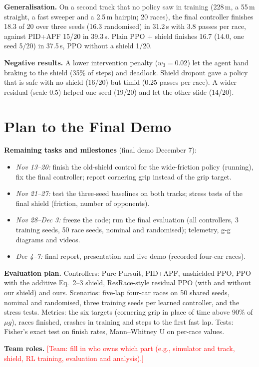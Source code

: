 \documentclass[conference]{IEEEtran}
\newcommand{\todo}[1]{\textcolor{red}{[#1]}}
\begin{document}
\textbf{Generalisation.} On a second track that no policy saw in training (228\,m, a 55\,m straight, a fast
sweeper and a 2.5\,m hairpin; 20 races), the final controller finishes 18.3 of 20 over three seeds (16.3 randomised) in
31.2\,s with 3.8 passes per race, against PID+APF 15/20 in 39.3\,s. Plain PPO + shield finishes 16.7 (14.0, one
seed 5/20) in 37.5\,s, PPO without a shield 1/20.

\textbf{Negative results.} A lower intervention penalty ($w_3 = 0.02$) let the agent hand braking to the
shield (35\% of steps) and deadlock. Shield dropout gave a policy that is safe with no shield (16/20) but timid
(0.25 passes per race). A wider residual (scale 0.5) helped one seed (19/20) and let the other slide (14/20).

\section{Plan to the Final Demo}
\textbf{Remaining tasks and milestones} (final demo December 7):
\begin{itemize}
\item \emph{Nov 13--20:} finish the old-shield control for the wide-friction policy (running), fix the final
controller; report cornering grip instead of the grip target.
\item \emph{Nov 21--27:} test the three-seed baselines on both tracks; stress tests of the final shield (friction,
number of opponents).
\item \emph{Nov 28--Dec 3:} freeze the code; run the final evaluation (all controllers, 3 training seeds, 50 race
seeds, nominal and randomised); telemetry, g-g diagrams and videos.
\item \emph{Dec 4--7:} final report, presentation and live demo (recorded four-car races).
\end{itemize}
\textbf{Evaluation plan.} Controllers: Pure Pursuit, PID+APF, unshielded PPO, PPO with the additive Eq.~2--3
shield, ResRace-style residual PPO (with and without our shield) and ours. Scenarios: five-lap four-car races on
50 shared seeds, nominal and randomised, three training seeds per learned controller, and the stress tests.
Metrics: the six targets (cornering grip in place of time above 90\% of $\mu g$), races finished, crashes in
training and steps to the first fast lap. Tests: Fisher's exact test on finish rates, Mann--Whitney U
on per-race values.

\textbf{Team roles.} \todo{Team: fill in who owns which part (e.g., simulator and track, shield, RL training,
evaluation and analysis).}
\end{document}
